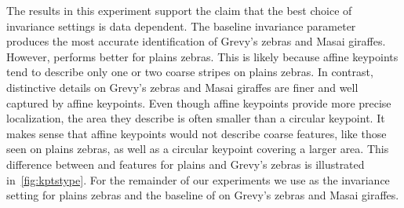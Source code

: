         The results in this experiment support the claim that the best
          choice of invariance settings is data dependent.
        The baseline invariance parameter \AIAlone{} produces the most
          accurate identification of  Grevy's zebras and Masai giraffes.
        However, \QRHCirc{} performs better for plains zebras.
        This is likely because affine keypoints tend to describe only
          one or two coarse stripes on plains zebras.
        In contrast, distinctive details on Grevy's zebras and Masai
          giraffes are finer and well captured by affine keypoints.
        Even though affine keypoints provide more precise localization,
          the area they describe is often smaller than a circular
          keypoint.
        It makes sense that affine keypoints would not describe coarse
          features, like those seen on plains zebras, as well as a
          circular keypoint covering a larger area.
        This difference between \AIAlone{} and  \QRHEll{} features for
          plains and Grevy's zebras is illustrated
          in~\cref{fig:kptstype}.
        For the remainder of our experiments we use \QRHCirc{} as the
          invariance setting for plains zebras and the baseline of
          \AIAlone{} on Grevy's zebras and Masai giraffes.

